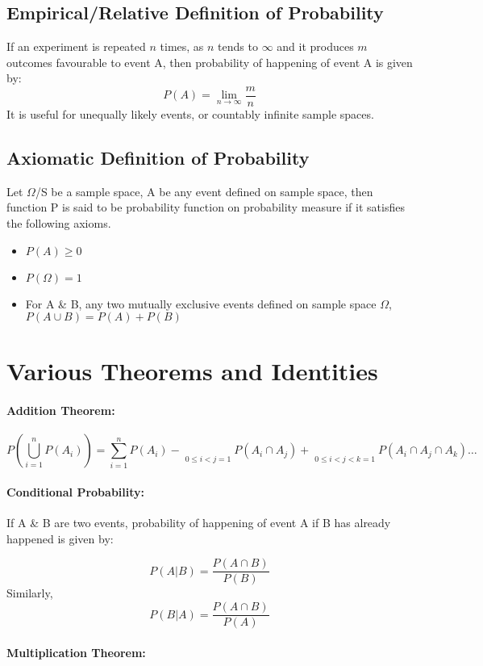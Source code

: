 \documentclass[
10pt, %
a4paper, %
]{report}
\begin{document}
\subsection{Empirical/Relative Definition of Probability}
 If an experiment is repeated \(n\) times, as \(n\) tends to \(\infty\) and it produces \(m\) outcomes favourable to event A, then probability of happening of event A is given by:
\[
P(A)=\lim_{n\to\infty}\frac{m}{n}
\]
It is useful for unequally likely events, or countably infinite sample spaces.

\subsection{Axiomatic Definition of Probability}
    Let \(\Omega\)/S be a sample space, A be any event defined on sample space, then function P is said to be probability function on probability measure if it satisfies the following axioms.
    \begin{itemize}
    \item \(P(A)\geq 0\)
    \item \(P(\Omega)=1\)
    \item For A \& B, any two mutually exclusive events defined on sample space \(\Omega\), \(P(A\cup B) = P(A)+P(B)\)
    \end{itemize}
    

\section{Various Theorems and Identities}
\paragraph{Addition Theorem:}
\[
P\left(\bigcup_{i=1}^n P(A_i)\right)=\sum_{i=1}^n P(A_i) - \mathop{\sum^n \sum^n}\limits_{0 \leq i < j=1} P(A_i \cap A_j) + \mathop{\sum^n \sum^n \sum^n}\limits_{0 \leq i < j < k=1} P(A_i \cap A_j \cap A_k) \dots \]


\paragraph{Conditional Probability:}

If A \& B are two events, probability of happening of event A if B has already happened is given by:

\[
P(A|B) = \frac{P(A\cap B)}{P(B)}
\]
Similarly, 
\[
P(B|A) = \frac{P(A\cap B)}{P(A)}
\]

\paragraph{Multiplication Theorem:}
\end{document}
